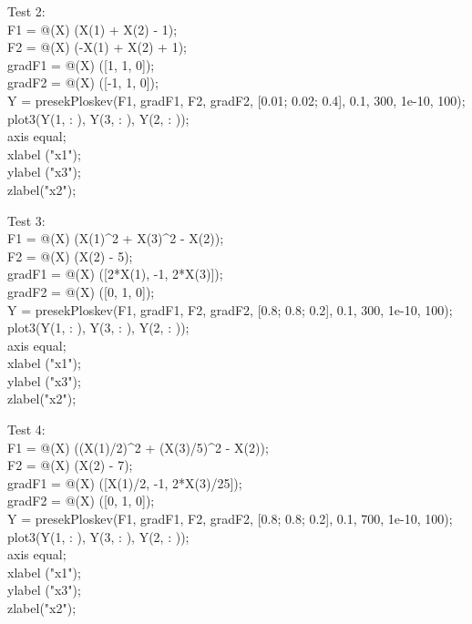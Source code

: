 \documentclass[12pt, letterpaper, twoside]{article}    %
\begin{document}
$$$$

Test 2: \\
F1 = @(X) (X(1) + X(2) - 1); \\
F2 = @(X) (-X(1) + X(2) + 1); \\
gradF1 = @(X) ([1, 1, 0]); \\
gradF2 = @(X) ([-1, 1, 0]); \\
Y = presekPloskev(F1, gradF1, F2, gradF2, [0.01; 0.02; 0.4], 0.1, 300, 1e-10, 100); \\
plot3(Y(1, : ), Y(3, : ), Y(2, : )); \\
axis equal; \\
xlabel ("x1"); \\
ylabel ("x3"); \\
zlabel("x2"); \\

\newpage

Test 3: \\
F1 = @(X) (X(1)\^{}2 + X(3)\^{}2 - X(2)); \\
F2 = @(X) (X(2) - 5); \\
gradF1 = @(X) ([2*X(1), -1, 2*X(3)]); \\
gradF2 = @(X) ([0, 1, 0]); \\
Y = presekPloskev(F1, gradF1, F2, gradF2, [0.8; 0.8; 0.2], 0.1, 300, 1e-10, 100); \\
plot3(Y(1, : ), Y(3, : ), Y(2, : )); \\
axis equal; \\
xlabel ("x1"); \\
ylabel ("x3"); \\
zlabel("x2"); \\

$$$$

Test 4: \\
F1 = @(X) ((X(1)/2)\^{}2 + (X(3)/5)\^{}2 - X(2)); \\
F2 = @(X) (X(2) - 7); \\
gradF1 = @(X) ([X(1)/2, -1, 2*X(3)/25]); \\
gradF2 = @(X) ([0, 1, 0]); \\
Y = presekPloskev(F1, gradF1, F2, gradF2, [0.8; 0.8; 0.2], 0.1, 700, 1e-10, 100); \\
plot3(Y(1, : ), Y(3, : ), Y(2, : )); \\
axis equal; \\
xlabel ("x1"); \\
ylabel ("x3"); \\
zlabel("x2"); \\
\end{document}
